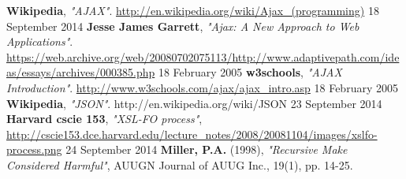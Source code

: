 \begin{thebibliography}{9}

   \textbf{Wikipedia},
   \emph{"AJAX"}.
   \url{http://en.wikipedia.org/wiki/Ajax\_(programming)}
   18 September 2014 
   \textbf{Jesse James Garrett},
   \emph{"Ajax: A New Approach to Web Applications"}.
   \url{https://web.archive.org/web/20080702075113/http://www.adaptivepath.com/ideas/essays/archives/000385.php}
   18 February 2005
   \textbf{w3schools},
   \emph{"AJAX Introduction"}.
   \url{http://www.w3schools.com/ajax/ajax\_intro.asp}
   18 February 2005
   \textbf{Wikipedia},
   \emph{"JSON"}.
   http://en.wikipedia.org/wiki/JSON
   23 September 2014
  \textbf{Harvard cscie 153},
  \emph{"XSL-FO process"},
  \url{http://cscie153.dce.harvard.edu/lecture\_notes/2008/20081104/images/xslfo-process.png}
  24 September 2014
  \textbf{Miller, P.A.} (1998), 
  \emph{"Recursive Make Considered Harmful"},
  AUUGN Journal of AUUG Inc., 19(1), pp. 14-25.
\end{thebibliography}